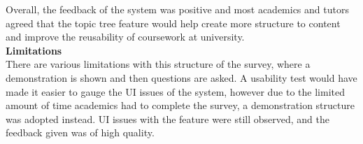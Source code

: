 Overall, the feedback of the system was positive and most academics and tutors agreed that the topic tree feature would help create more structure to content and improve the reusability of coursework at university.\\

\textbf{Limitations} \\
There are various limitations with this structure of the survey, where a demonstration is shown and then questions are asked. A usability test would have made it easier to gauge the UI issues of the system, however due to the limited amount of time academics had to complete the survey, a demonstration structure was adopted instead. UI issues with the feature were still observed, and the feedback given was of high quality.
